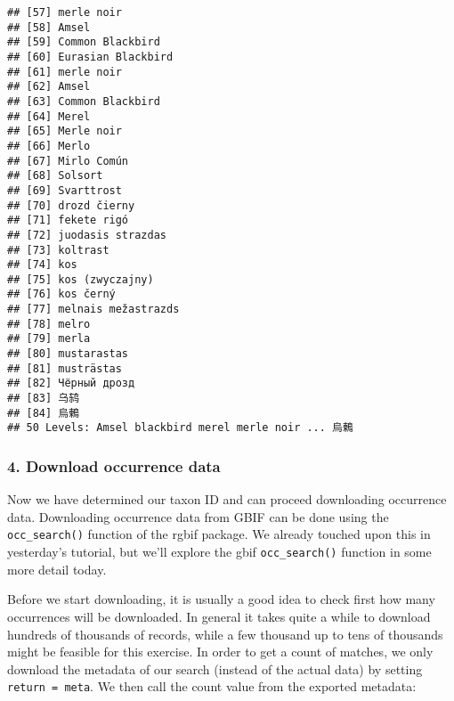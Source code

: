 \documentclass[]{article}
\begin{document}
\begin{verbatim}
## [57] merle noir                           
## [58] Amsel                                
## [59] Common Blackbird                     
## [60] Eurasian Blackbird                   
## [61] merle noir                           
## [62] Amsel                                
## [63] Common Blackbird                     
## [64] Merel                                
## [65] Merle noir                           
## [66] Merlo                                
## [67] Mirlo Común                          
## [68] Solsort                              
## [69] Svarttrost                           
## [70] drozd čierny                         
## [71] fekete rigó                          
## [72] juodasis strazdas                    
## [73] koltrast                             
## [74] kos                                  
## [75] kos (zwyczajny)                      
## [76] kos černý                            
## [77] melnais mežastrazds                  
## [78] melro                                
## [79] merla                                
## [80] mustarastas                          
## [81] musträstas                           
## [82] Чёрный дрозд                         
## [83] 乌鸫                                 
## [84] 烏鶇                                 
## 50 Levels: Amsel blackbird merel merle noir ... 烏鶇
\end{verbatim}

\hypertarget{download-occurrence-data}{%
\subsubsection{4. Download occurrence
data}\label{download-occurrence-data}}

Now we have determined our taxon ID and can proceed downloading
occurrence data. Downloading occurrence data from GBIF can be done using
the \texttt{occ\_search()} function of the rgbif package. We already
touched upon this in yesterday's tutorial, but we'll explore the gbif
\texttt{occ\_search()} function in some more detail today.

Before we start downloading, it is usually a good idea to check first
how many occurrences will be downloaded. In general it takes quite a
while to download hundreds of thousands of records, while a few thousand
up to tens of thousands might be feasible for this exercise. In order to
get a count of matches, we only download the metadata of our search
(instead of the actual data) by setting
\texttt{return\ =\ \textquotesingle{}meta\textquotesingle{}}. We then
call the count value from the exported metadata:
\end{document}
